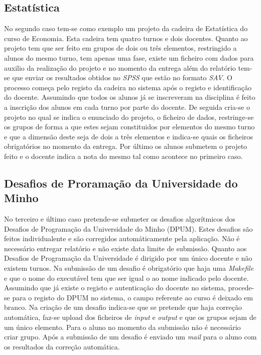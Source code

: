\subsection{Estatística} %
\label{sub:estat_stica}


No segundo caso tem-se como exemplo um projeto da cadeira de Estatística do curso de Economia. Esta cadeira tem quatro turnos e dois docentes. Quanto ao projeto tem que ser feito em grupos de dois ou três elementos, restringido a alunos do mesmo turno, tem apenas uma fase, existe um ficheiro com dados para auxilio da realização do projeto e no momento da entrega além do relatório tem-se que enviar os resultados obtidos no \emph{SPSS} que estão no formato \emph{SAV}.
O processo começa pelo registo da cadeira no sistema após o registo e identificação do docente. Assumindo que todos os alunos já se inscreveram na disciplina é feito a inscrição dos alunos em cada turno por parte do docente. De seguida cria-se o projeto no qual se indica o enunciado do projeto, o ficheiro de dados, restringe-se os grupos de forma a que estes sejam constituidos por elementos do mesmo turno e que a dimensão deste seja de dois a três elementos e indica-se quais os ficheiros obrigatórios no momento da entrega. Por último os alunos submetem o projeto feito e o docente indica a nota do mesmo tal como acontece no primeiro caso.

\subsection{Desafios de Proramação da Universidade do Minho} %
\label{sub:desafios_de_prorama_o_da_universidade_do_minho}


No terceiro e último caso pretende-se submeter os desafios algorítmicos dos Desafios de Programação da Universidade do Minho (DPUM). Estes desafios são feitos individualente e são corregidos automáticamente pela aplicação. Não é necessário entregar relatório e não existe data limite de submissão.
Quanto aos Desafios de Programação da Universidade é dirigido por um único docente e não existem turnos. Na submissão de um desafio é obrigatório que haja uma \emph{Makefile} e que o nome do executável tem que ser igual o ao nome indicado pelo docente.
Assumindo que já existe o registo e autenticação do docente no sistema, procede-se para o registo do DPUM no sistema, o campo referente ao curso é deixado em branco.
Na criação de um desafio indica-se que se pretende que haja correção automática, faz-se upload dos ficheiros de \emph{input} e \emph{output} e que os grupos sejam de um único elemento. Para o aluno no momento da submissão não é necessário criar grupo. Após a submissão de um desafio é enviado um \emph{mail} para o aluno com os resultados da correção automática.




